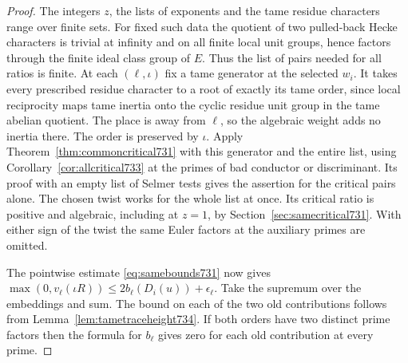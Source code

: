 \documentclass[a4paper,11pt]{article}
\theoremstyle{definition}
\theoremstyle{remark}
\numberwithin{equation}{section}
\begin{document}
\begin{proof}
The integers \(z\), the lists of exponents and the tame residue
characters range over finite sets. For fixed such data the quotient
of two pulled-back Hecke characters is trivial at infinity and on all
finite local unit groups, hence factors through the finite ideal class
group of \(E\). Thus the list of pairs needed for all ratios is finite.
At each \((\ell,\iota)\) fix a tame generator at the selected \(w_i\).
It takes every prescribed residue character to a root of exactly its
tame order, since local reciprocity maps tame inertia onto the cyclic
residue unit group in the tame abelian quotient. The place is away
from \(\ell\), so the algebraic weight adds no inertia there. The
order is preserved by \(\iota\). Apply
Theorem~\ref{thm:commoncritical731} with this generator and the
entire list, using Corollary~\ref{cor:allcritical733} at the primes
of bad conductor or discriminant. Its proof with an empty list of
Selmer tests gives the assertion for the critical pairs alone.
The chosen twist works for the whole list at once. Its critical
ratio is positive and algebraic, including at \(z=1\), by
Section~\ref{sec:samecritical731}. With either sign of the twist the
same Euler factors at the auxiliary primes are omitted.

The pointwise estimate \eqref{eq:samebounds731} now gives
\(\max(0,v_\ell(\iota R))\le 2b_\ell(D_i(u))+\epsilon_\ell\).
Take the supremum over the embeddings and sum. The bound on each of
the two old contributions follows from Lemma~\ref{lem:tametraceheight734}.
If both orders have two distinct prime factors then the formula for
\(b_\ell\) gives zero for each old contribution at every prime.
\end{proof}
\end{document}
